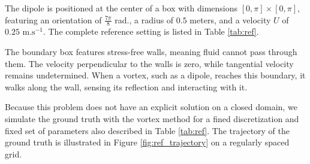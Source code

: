 The dipole is positioned at the center of a box with dimensions $[0, \pi] \times [0, \pi]$, featuring an orientation of $\frac{7\pi}{8}$ rad., a radius of $0.5$ meters, and a velocity $U$ of $0.25 \text{ m.s}^{-1}$. The complete reference setting is listed in Table \ref{tab:ref}.

The boundary box features stress-free walls, meaning fluid cannot pass through them. The velocity perpendicular to the walls is zero, while tangential velocity remains undetermined. When a vortex, such as a dipole, reaches this boundary, it walks along the wall, sensing its reflection and interacting with it.

Because this problem does not have an explicit solution on a closed domain, we simulate the ground truth with the vortex method for a fined discretization and fixed set of parameters also described in Table \ref{tab:ref}. The trajectory of the ground truth is illustrated in Figure \ref{fig:ref_trajectory} on a regularly spaced grid.

